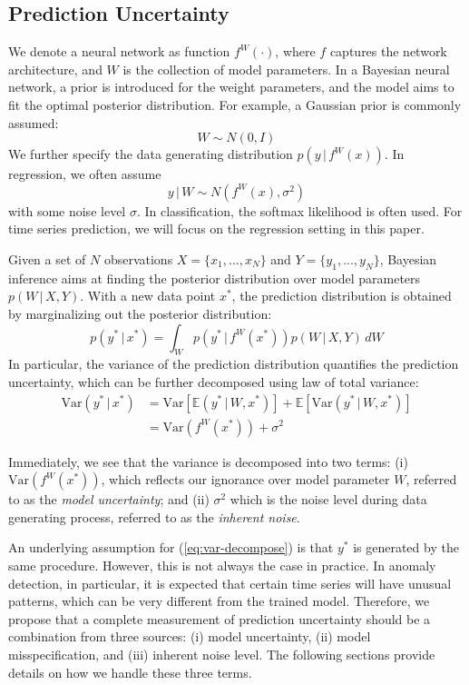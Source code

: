 \documentclass[conference,compsoc,final]{IEEEtran}
\begin{document}
\subsection{Prediction Uncertainty}
\label{sec:uncertainty}

We denote a neural network as function $f^W(\cdot)$, where $f$ captures the network architecture, and $W$ is the collection of model parameters. 
In a Bayesian neural network, a prior is introduced for the weight parameters, and the model aims to fit the optimal posterior distribution. For example, a Gaussian prior is commonly assumed:
\[W \sim N(0, I)\]
We further specify the data generating distribution $p(y \,|\, f^W(x))$. In regression, we often assume
\[ y\,|\, W \sim N(f^W(x), \sigma^2) \]
with some noise level $\sigma$. In classification, the softmax likelihood is often used. For time series prediction, we will focus on the regression setting in this paper.

Given a set of $N$ observations $X=\{x_1, ..., x_N\}$ and $Y=\{y_1, ..., y_N\}$, Bayesian inference aims at finding the posterior distribution over model parameters $p(W \,|\, X, Y)$. With a new data point $x^*$, the prediction distribution is obtained by marginalizing out the posterior distribution:
\[ p(y^* \,|\, x^*) = \int_W p(y^* \,|\, f^W(x^*)) p(W \,|\, X, Y)\, dW \]
In particular, the variance of the prediction distribution quantifies the prediction uncertainty, which can be further decomposed using law of total variance:
\begin{equation}
\begin{split}
\textrm{Var}(y^* \,|\, x^*) & = 
\textrm{Var}\left[ \mathbb{E}(y^* \,|\, W, x^*) \right] +
\mathbb{E}\left[\textrm{Var}(y^* \,|\, W, x^*) \right] \\
& = \textrm{Var}(f^W(x^*)) + \sigma^2
\end{split}
\label{eq:var-decompose}
\end{equation}

Immediately, we see that the variance is decomposed into two terms: (i) $\textrm{Var}(f^W(x^*))$, which reflects our ignorance over model parameter $W$, referred to as the {\it model uncertainty}; and (ii) $\sigma^2$ which is the noise level during data generating process,  referred to as the {\it inherent noise}.

An underlying assumption for (\ref{eq:var-decompose}) is that $y^*$ is generated by the same procedure. However, this is not always the case in practice. In anomaly detection, in particular, it is expected that certain time series will have unusual patterns, which can be very different from the trained model. Therefore, we propose that a complete measurement of prediction uncertainty should be a combination from three sources: (i) model uncertainty, (ii) model misspecification, and (iii) inherent noise level. 
The following sections provide details on how we handle these three terms.
\end{document}
